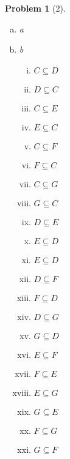 \documentclass{article}
\theoremstyle{problem}
\newtheorem{prob}{Problem}
\theoremstyle{plain}
\begin{document}
\begin{prob}[2]\ \\[-1cm]
  \begin{enumerate}[a)]
    \item a
    \item b
      \begin{enumerate}[i.]
        \item $C \subseteq D$
        \item $D \subseteq C$
        \item $C \subseteq E$
        \item $E \subseteq C$
        \item $C \subseteq F$
        \item $F \subseteq C$
        \item $C \subseteq G$
        \item $G \subseteq C$
        \item $D \subseteq E$
        \item $E \subseteq D$
\item $E \subseteq D$
\item $D \subseteq F$
\item $F \subseteq D$
\item $D \subseteq G$
\item $G \subseteq D$
\item $E \subseteq F$
\item $F \subseteq E$
\item $E \subseteq G$
\item $G \subseteq E$
\item $F \subseteq G$
\item $G \subseteq F$
        \end{enumerate}    
    \end{enumerate}
    \end{prob}
\end{document}
